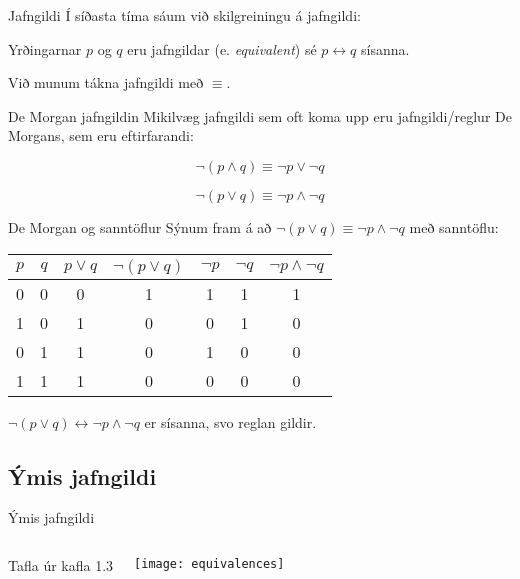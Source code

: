\documentclass{beamer}
\begin{document}
\begin{frame}{Jafngildi}
Í síðasta tíma sáum við skilgreiningu á jafngildi:

\begin{tcolorbox}[title=Jafngildi]
Yrðingarnar $p$ og $q$ eru jafngildar (e. \emph{equivalent}) sé $p \leftrightarrow q$ sísanna.
\end{tcolorbox}

Við munum tákna jafngildi með $\equiv$.
\end{frame}

\begin{frame}{De Morgan jafngildin}
Mikilvæg jafngildi sem oft koma upp eru jafngildi/reglur De Morgans, sem eru eftirfarandi:

\[
 \lnot ( p \land q ) \equiv \lnot p \lor \lnot q
\]

\[
 \lnot (p \lor q ) \equiv \lnot p \land \lnot q
\]

\end{frame}

\begin{frame}{De Morgan og sanntöflur}
Sýnum fram á að $\lnot (p \lor q ) \equiv \lnot p \land \lnot q$ með sanntöflu:
\begin{center}
\begin{tabular}{ccccccc}
\toprule
$p$&$q$&$p \lor q$&$\lnot(p \lor q)$&$\lnot p$&$\lnot q$&$\lnot p \land \lnot q$\\
\midrule
0&0&0&1&1&1&1\\
1&0&1&0&0&1&0\\
0&1&1&0&1&0&0\\
1&1&1&0&0&0&0\\
\bottomrule
\end{tabular}
\end{center}
$\lnot (p \lor q ) \leftrightarrow \lnot p \land \lnot q$ er sísanna, svo reglan gildir.
\end{frame}

\subsection{Ýmis jafngildi}

\begin{frame}{Ýmis jafngildi}
\begin{columns}
Tafla úr kafla 1.3
\begin{center}
\texttt{[image: equivalences]}
\end{center}
\end{columns}
\end{frame}
\end{document}
